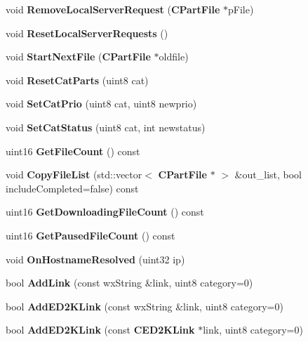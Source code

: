 \begin{DoxyCompactItemize}
\item 
void {\bf RemoveLocalServerRequest} ({\bf CPartFile} $\ast$pFile)\label{classCDownloadQueue_ae5f0a490fb97ca80ab7bdce4f19d4061}

\item 
void {\bf ResetLocalServerRequests} ()\label{classCDownloadQueue_a04932e62ed208305df22509d5b9b5a3f}

\item 
void {\bf StartNextFile} ({\bf CPartFile} $\ast$oldfile)
\item 
void {\bf ResetCatParts} (uint8 cat)\label{classCDownloadQueue_a7b20bda119d3d274e6a62a998e8cd66e}

\item 
void {\bf SetCatPrio} (uint8 cat, uint8 newprio)\label{classCDownloadQueue_a19f92465551dd9eb3033326a579b1bf9}

\item 
void {\bf SetCatStatus} (uint8 cat, int newstatus)\label{classCDownloadQueue_ad8b0b99302ebd970b65e082d74a43ed1}

\item 
uint16 {\bf GetFileCount} () const \label{classCDownloadQueue_a4afdaa4a0005b6a409eb9156ba770c60}

\item 
void {\bf CopyFileList} (std::vector$<$ {\bf CPartFile} $\ast$ $>$ \&out\_\-list, bool includeCompleted=false) const \label{classCDownloadQueue_af416cfa4702c432171f2e0acfd0d055e}

\item 
uint16 {\bf GetDownloadingFileCount} () const \label{classCDownloadQueue_a8a3ede3222b2b2a8ef91d6a1bad4d9c7}

\item 
uint16 {\bf GetPausedFileCount} () const \label{classCDownloadQueue_a852e350315ba3dbb7084583337cef1ec}

\item 
void {\bf OnHostnameResolved} (uint32 ip)\label{classCDownloadQueue_aa307bb211a7bc6874c5b5302dc4a6443}

\item 
bool {\bf AddLink} (const wxString \&link, uint8 category=0)\label{classCDownloadQueue_a5e97c6ab258cf32577d23813f1b55a05}

\item 
bool {\bfseries AddED2KLink} (const wxString \&link, uint8 category=0)\label{classCDownloadQueue_a47b40e92db60a570f05107df4561926f}

\item 
bool {\bfseries AddED2KLink} (const {\bf CED2KLink} $\ast$link, uint8 category=0)\label{classCDownloadQueue_a6fa618f5be7a1417fb6a7b5c30dab0af}


\end{DoxyCompactItemize}
